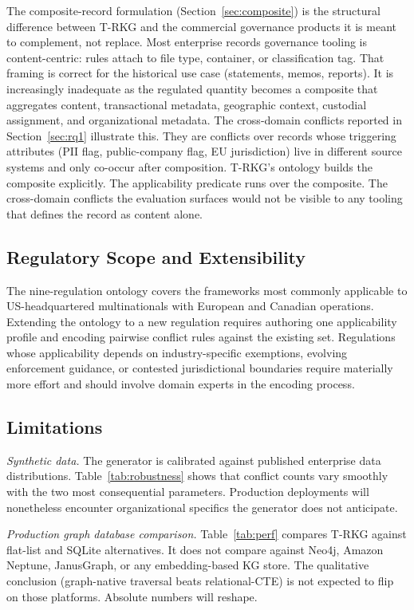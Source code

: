 \documentclass{ieeeaccess}
\begin{document}
The composite-record formulation (Section~\ref{sec:composite}) is the structural difference between T-RKG and the commercial governance products it is meant to complement, not replace. Most enterprise records governance tooling is content-centric: rules attach to file type, container, or classification tag. That framing is correct for the historical use case (statements, memos, reports). It is increasingly inadequate as the regulated quantity becomes a composite that aggregates content, transactional metadata, geographic context, custodial assignment, and organizational metadata. The cross-domain conflicts reported in Section~\ref{sec:rq1} illustrate this. They are conflicts over records whose triggering attributes (PII flag, public-company flag, EU jurisdiction) live in different source systems and only co-occur after composition. T-RKG's ontology builds the composite explicitly. The applicability predicate runs over the composite. The cross-domain conflicts the evaluation surfaces would not be visible to any tooling that defines the record as content alone.

\subsection{Regulatory Scope and Extensibility}

The nine-regulation ontology covers the frameworks most commonly applicable to US-headquartered multinationals with European and Canadian operations. Extending the ontology to a new regulation requires authoring one applicability profile and encoding pairwise conflict rules against the existing set. Regulations whose applicability depends on industry-specific exemptions, evolving enforcement guidance, or contested jurisdictional boundaries require materially more effort and should involve domain experts in the encoding process.

\subsection{Limitations}

\textit{Synthetic data.} The generator is calibrated against published enterprise data distributions. Table~\ref{tab:robustness} shows that conflict counts vary smoothly with the two most consequential parameters. Production deployments will nonetheless encounter organizational specifics the generator does not anticipate.

\textit{Production graph database comparison.} Table~\ref{tab:perf} compares T-RKG against flat-list and SQLite alternatives. It does not compare against Neo4j, Amazon Neptune, JanusGraph, or any embedding-based KG store. The qualitative conclusion (graph-native traversal beats relational-CTE) is not expected to flip on those platforms. Absolute numbers will reshape.
\end{document}
